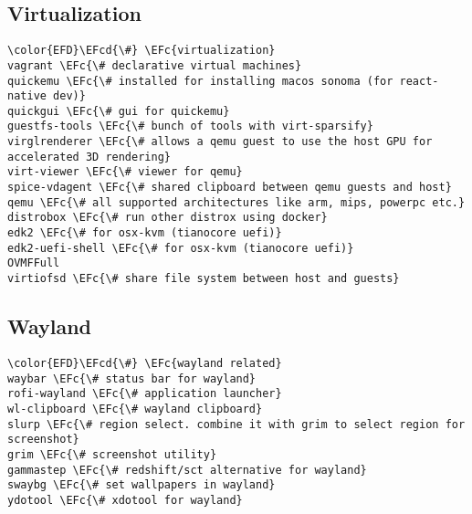 \documentclass[14pt]{article}
\newcommand{\EFc}[1]{\textcolor{EFc}{#1}} %
\newcommand{\EFcd}[1]{\textcolor{EFcd}{#1}} %
\begin{document}
\subsection{Virtualization}
\label{sec:org6729f72}
\begin{Code}
\begin{Verbatim}
\color{EFD}\EFcd{\#} \EFc{virtualization}
vagrant \EFc{\# declarative virtual machines}
quickemu \EFc{\# installed for installing macos sonoma (for react-native dev)}
quickgui \EFc{\# gui for quickemu}
guestfs-tools \EFc{\# bunch of tools with virt-sparsify}
virglrenderer \EFc{\# allows a qemu guest to use the host GPU for accelerated 3D rendering}
virt-viewer \EFc{\# viewer for qemu}
spice-vdagent \EFc{\# shared clipboard between qemu guests and host}
qemu \EFc{\# all supported architectures like arm, mips, powerpc etc.}
distrobox \EFc{\# run other distrox using docker}
edk2 \EFc{\# for osx-kvm (tianocore uefi)}
edk2-uefi-shell \EFc{\# for osx-kvm (tianocore uefi)}
OVMFFull
virtiofsd \EFc{\# share file system between host and guests}
\end{Verbatim}
\end{Code}
\subsection{Wayland}
\label{sec:org8bdf9c0}
\begin{Code}
\begin{Verbatim}
\color{EFD}\EFcd{\#} \EFc{wayland related}
waybar \EFc{\# status bar for wayland}
rofi-wayland \EFc{\# application launcher}
wl-clipboard \EFc{\# wayland clipboard}
slurp \EFc{\# region select. combine it with grim to select region for screenshot}
grim \EFc{\# screenshot utility}
gammastep \EFc{\# redshift/sct alternative for wayland}
swaybg \EFc{\# set wallpapers in wayland}
ydotool \EFc{\# xdotool for wayland}
\end{Verbatim}
\end{Code}
\end{document}
